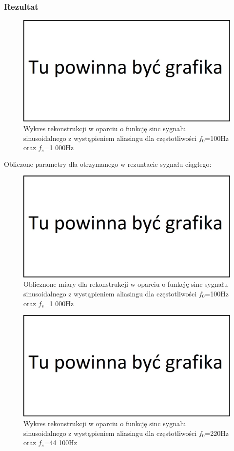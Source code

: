 \documentclass[12pt]{article}
\begin{document}
\subsubsection{Rezultat}
\begin{figure}[H]
	\centering
	\includegraphics[width=\linewidth]{tmp.jpg}
	\caption{Wykres rekonstrukcji w oparciu o funkcję sinc sygnału sinusoidalnego z wystąpieniem aliasingu dla częstotliwości $f_0$=100Hz oraz $f_s$=1 000Hz}
	\label{wykres dla eksperymentu 6}
\end{figure}
Obliczone parametry dla otrzymanego w rezuntacie sygnału ciągłego:
\begin{figure}[H]
	\centering
	\includegraphics[width=\linewidth]{tmp.jpg}
	\caption{Oblicznone miary dla rekonstrukcji w oparciu o funkcję sinc sygnału sinusoidalnego z wystąpieniem aliasingu dla częstotliwości $f_0$=100Hz oraz $f_s$=1 000Hz} 
	\label{wartości dla eksperymentu 6}
\end{figure}
\begin{figure}[H]
	\centering
	\includegraphics[width=\linewidth]{tmp.jpg}
	\caption{Wykres rekonstrukcji w oparciu o funkcję sinc sygnału sinusoidalnego z wystąpieniem aliasingu dla częstotliwości $f_0$=220Hz oraz $f_s$=44 100Hz}
	\label{wykres dla eksperymentu 6.2}
\end{figure}
\end{document}
